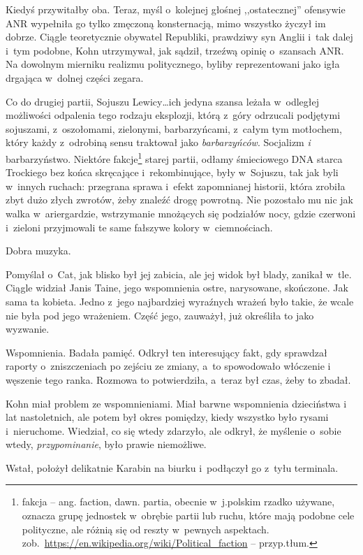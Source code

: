 \documentclass[oneside,polish,11pt,sfheadings]{mwbk}
\begin{document}
Kiedyś przywitałby oba. Teraz, myśl o~kolejnej głośnej ,,ostatecznej''
ofensywie ANR wypełniła go tylko zmęczoną konsternacją, mimo wszystko
życzył im dobrze. Ciągle teoretycznie obywatel Republiki, prawdziwy syn
Anglii i~tak dalej i~tym podobne, Kohn utrzymywał, jak sądził, trzeźwą
opinię o~szansach ANR. Na dowolnym mierniku realizmu politycznego,
byliby reprezentowani jako igła drgająca w~dolnej części zegara.

Co do drugiej partii, Sojuszu Lewicy\ldots ich jedyna szansa leżała w~odległej możliwości odpalenia tego rodzaju eksplozji, którą z~góry
odrzucali podjętymi sojuszami, z~oszołomami, zielonymi, barbarzyńcami, z~całym tym motłochem, który każdy z~odrobiną sensu traktował jako
\emph{barbarzyńców}. Socjalizm \emph{i} barbarzyństwo. Niektóre
fakcje\footnote{fakcja -- ang. faction, dawn. partia, obecnie w~j.polskim
rzadko używane, oznacza grupę jednostek w~obrębie partii lub ruchu,
które mają podobne cele polityczne, ale różnią się od reszty w~pewnych
aspektach. zob.~\url{https://en.wikipedia.org/wiki/Political\_faction} --
przyp.tłum.} starej partii, odłamy śmieciowego DNA starca Trockiego bez
końca skręcające i~rekombinujące, były w~Sojuszu, tak jak byli w~innych
ruchach: przegrana sprawa i~efekt zapomnianej historii, która zrobiła
zbyt dużo złych zwrotów, żeby znaleźć drogę powrotną. Nie pozostało mu
nic jak walka w~ariergardzie, wstrzymanie mnożących się podziałów nocy,
gdzie czerwoni i~zieloni przyjmowali te same fałszywe kolory w~ciemnościach.

Dobra muzyka.

Pomyślał o~Cat, jak blisko był jej zabicia, ale jej widok był blady,
zanikał w~tle. Ciągle widział Janis Taine, jego wspomnienia ostre,
narysowane, skończone. Jak sama ta kobieta. Jedno z~jego najbardziej
wyraźnych wrażeń było takie, że wcale nie była pod jego wrażeniem. Część
jego, zauważył, już określiła to jako wyzwanie.

Wspomnienia. Badała pamięć. Odkrył ten interesujący fakt, gdy sprawdzał
raporty o~zniszczeniach po zejściu ze zmiany, a~to spowodowało włóczenie
i węszenie tego ranka. Rozmowa to potwierdziła, a~teraz był czas, żeby
to zbadał.

Kohn miał problem ze wspomnieniami. Miał barwne wspomnienia dzieciństwa
i lat nastoletnich, ale potem był okres pomiędzy, kiedy wszystko było
rysami i~nieruchome. Wiedział, co się wtedy zdarzyło, ale odkrył, że
myślenie o~sobie wtedy, \emph{przypominanie}, było prawie niemożliwe.

Wstał, położył delikatnie Karabin na biurku i~podłączył go z~tyłu
terminala.
\end{document}
